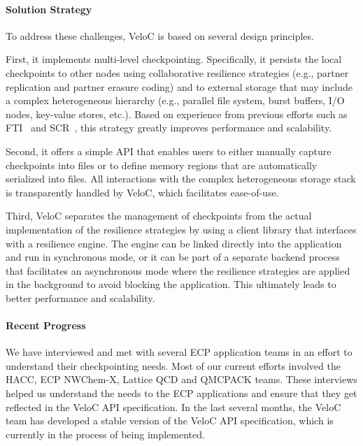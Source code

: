 \paragraph{Solution Strategy}

To address these challenges, VeloC is based on several design principles.

First, it implements multi-level checkpointing. Specifically, it
persists the local checkpoints to other nodes using collaborative
resilience strategies (e.g., partner replication and partner erasure
coding) and to external storage that may include a complex
heterogeneous hierarchy (e.g., parallel file system, burst buffers,
I/O nodes, key-value stores, etc.). Based on experience from previous
efforts such as FTI~\cite{FTI} and SCR~\cite{SCR}, this strategy
greatly improves performance and scalability.

Second, it offers a simple API that enables users to either manually
capture checkpoints into files or to define memory regions
that are automatically serialized into files. All interactions
with the complex heterogeneous storage stack is transparently handled
by VeloC, which facilitates ease-of-use.

Third, VeloC separates the management of checkpoints
from the actual implementation of the resilience strategies by
using a client library that interfaces with a resilience engine.
The engine can be linked directly into the application and
run in synchronous mode, or it can be part of a separate backend
process that facilitates an asynchronous mode where the resilience
strategies are applied in the background to avoid blocking the
application. This ultimately leads to better performance and scalability.

\paragraph{Recent Progress}

We have interviewed and met with several ECP application teams in an
effort to understand their checkpointing needs. Most of our current
efforts involved the HACC, ECP NWChem-X, Lattice QCD and QMCPACK
teams. These interviews helped us understand the needs to the ECP
applications and ensure that they get reflected in the VeloC API
specification. In the last several months, the VeloC team has
developed a stable version of the VeloC API specification, which is
currently in the process of being implemented.

